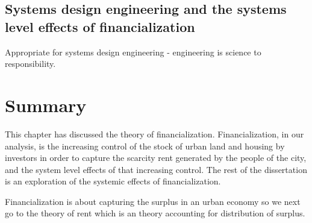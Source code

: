 \subsection{Systems design engineering and the systems level effects of financialization}
Appropriate for systems design engineering
- engineering is science to responsibility.


\section{Summary} %
This chapter has discussed the theory of financialization.
Financialization, in our analysis, is the increasing control of the stock of urban land and housing by investors in order to capture the scarcity rent generated by the people of the city, and the system level effects of that increasing control.  The rest of the dissertation is an exploration of the systemic effects of financialization. 

Financialization is about capturing the surplus in an urban economy so we next go to the theory of rent which is an theory accounting for distribution of surplus. 





